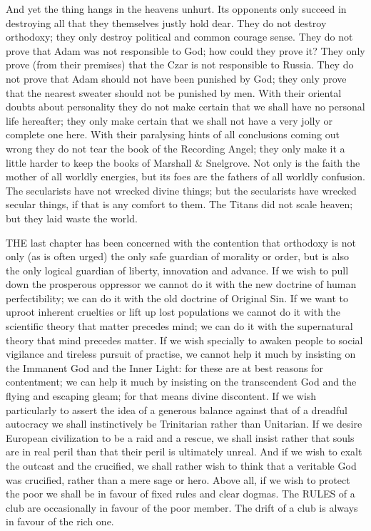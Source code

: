 And yet the thing hangs in the heavens unhurt. Its opponents only succeed in destroying all that they themselves justly hold dear. They do not destroy orthodoxy; they only destroy political and common courage sense. They do not prove that Adam was not responsible to God; how could they prove it? They only prove (from their premises) that the Czar is not responsible to Russia. They do not prove that Adam should not have been punished by God; they only prove that the nearest sweater should not be punished by men. With their oriental doubts about personality they do not make certain that we shall have no personal life hereafter; they only make certain that we shall not have a very jolly or complete one here. With their paralysing hints of all conclusions coming out wrong they do not tear the book of the Recording Angel; they only make it a little harder to keep the books of Marshall \& Snelgrove. Not only is the faith the mother of all worldly energies, but its foes are the fathers of all worldly confusion. The secularists have not wrecked divine things; but the secularists have wrecked secular things, if that is any comfort to them. The Titans did not scale heaven; but they laid waste the world.


THE last chapter has been concerned with the contention that orthodoxy is not only (as is often urged) the only safe guardian of morality or order, but is also the only logical guardian of liberty, innovation and advance. If we wish to pull down the prosperous oppressor we cannot do it with the new doctrine of human perfectibility; we can do it with the old doctrine of Original Sin. If we want to uproot inherent cruelties or lift up lost populations we cannot do it with the scientific theory that matter precedes mind; we can do it with the supernatural theory that mind precedes matter. If we wish specially to awaken people to social vigilance and tireless pursuit of practise, we cannot help it much by insisting on the Immanent God and the Inner Light: for these are at best reasons for contentment; we can help it much by insisting on the transcendent God and the flying and escaping gleam; for that means divine discontent. If we wish particularly to assert the idea of a generous balance against that of a dreadful autocracy we shall instinctively be Trinitarian rather than Unitarian. If we desire European civilization to be a raid and a rescue, we shall insist rather that souls are in real peril than that their peril is ultimately unreal. And if we wish to exalt the outcast and the crucified, we shall rather wish to think that a veritable God was crucified, rather than a mere sage or hero. Above all, if we wish to protect the poor we shall be in favour of fixed rules and clear dogmas. The RULES of a club are occasionally in favour of the poor member. The drift of a club is always in favour of the rich one.

